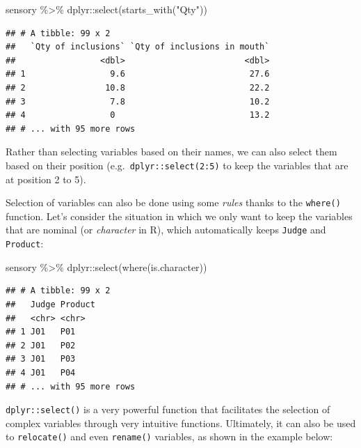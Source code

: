 \documentclass[
]{krantz}
\makeatletter
\newenvironment{Shaded}{\begin{snugshade}}{\end{snugshade}}
\newcommand{\FunctionTok}[1]{\textcolor[rgb]{0,0,0}{#1}}
\newcommand{\NormalTok}[1]{#1}
\newcommand{\SpecialCharTok}[1]{\textcolor[rgb]{0,0,0}{#1}}
\newcommand{\StringTok}[1]{\textcolor[rgb]{0.5,0.5,0.5}{#1}}
\newenvironment{kframe}{%
\medskip{}
\setlength{\fboxsep}{.8em}
 \def\at@end@of@kframe{}%
 \ifinner\ifhmode%
  \def\at@end@of@kframe{\end{minipage}}%
  \begin{minipage}{\columnwidth}%
 \fi\fi%
 \def\FrameCommand##1{\hskip\@totalleftmargin \hskip-\fboxsep
 \colorbox{shadecolor}{##1}\hskip-\fboxsep
     \hskip-\linewidth \hskip-\@totalleftmargin \hskip\columnwidth}%
 \MakeFramed {\advance\hsize-\width
   \@totalleftmargin\z@ \linewidth\hsize
   \@setminipage}}%
 {\par\unskip\endMakeFramed%
 \at@end@of@kframe}
\renewenvironment{Shaded}{\begin{kframe}}{\end{kframe}}
\makeatother
\begin{document}
\begin{Shaded}
\begin{Highlighting}[]
\NormalTok{sensory }\SpecialCharTok{\%\textgreater{}\%}
\NormalTok{  dplyr}\SpecialCharTok{::}\FunctionTok{select}\NormalTok{(}\FunctionTok{starts\_with}\NormalTok{(}\StringTok{"Qty"}\NormalTok{))}
\end{Highlighting}
\end{Shaded}

\begin{verbatim}
## # A tibble: 99 x 2
##   `Qty of inclusions` `Qty of inclusions in mouth`
##                 <dbl>                        <dbl>
## 1                 9.6                         27.6
## 2                10.8                         22.2
## 3                 7.8                         10.2
## 4                 0                           13.2
## # ... with 95 more rows
\end{verbatim}

Rather than selecting variables based on their names, we can also select them based on their position (e.g.~\texttt{dplyr::select(2:5)} to keep the variables that are at position 2 to 5).

Selection of variables can also be done using some \emph{rules} thanks to the \texttt{where()} function. Let's consider the situation in which we only want to keep the variables that are nominal (or \emph{character} in R), which automatically keeps \texttt{Judge} and \texttt{Product}:

\begin{Shaded}
\begin{Highlighting}[]
\NormalTok{sensory }\SpecialCharTok{\%\textgreater{}\%}
\NormalTok{  dplyr}\SpecialCharTok{::}\FunctionTok{select}\NormalTok{(}\FunctionTok{where}\NormalTok{(is.character))}
\end{Highlighting}
\end{Shaded}

\begin{verbatim}
## # A tibble: 99 x 2
##   Judge Product
##   <chr> <chr>  
## 1 J01   P01    
## 2 J01   P02    
## 3 J01   P03    
## 4 J01   P04    
## # ... with 95 more rows
\end{verbatim}

\texttt{dplyr::select()} is a very powerful function that facilitates the selection of complex variables through very intuitive functions. Ultimately, it can also be used to \texttt{relocate()} and even \texttt{rename()} variables, as shown in the example below:
\end{document}
